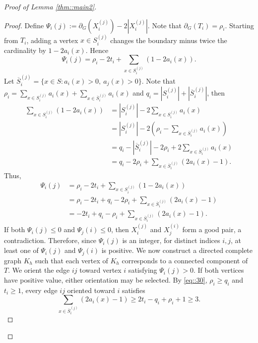 \documentclass[11pt]{article}
\theoremstyle{definition}
\begin{document}
\begin{proof}[Proof of Lemma \ref{thm::main2}]
\begin{proof}
    Define $\Psi_i(j) :=\partial_G(X_i^{(j)})-2|X_i^{(j)}|$.  Note that $\partial_G(T_i)=\rho_i$.  Starting from $T_i$, adding a vertex $x\in S_i^{(j)}$ changes the boundary minus twice the cardinality by $1-2a_i(x)$. Hence
    $$
      \Psi_i(j)=\rho_i-2t_i+\sum_{x\in S_i^{(j)}}(1-2a_i(x)).
    $$
    Let $\overline{S}_{i}^{(j)}=\{x\in S:a_i(x)>0,\ a_j(x)>0\}$. Note that $\rho_i=\sum_{x\in S_i^{(j)}}a_i(x)+\sum_{x\in \overline{S}_{i}^{(j)}}a_i(x)$ and $q_i=|S_i^{(j)}|+|\overline{S}_{i}^{(j)}|$, then
    \begin{equation*}
      \begin{aligned}
        \sum_{x\in S_i^{(j)}}(1-2a_i(x)) & = |S_i^{(j)}|-2\sum_{x\in S_i^{(j)}}a_i(x)                                      \\
                                         & =|S_i^{(j)}|-2(\rho_i-\sum_{x\in \overline{S}_{i}^{(j)}}a_i(x))                 \\
                                         & =q_i-|\overline{S}_{i}^{(j)}|-2\rho_i+2\sum_{x\in \overline{S}_{i}^{(j)}}a_i(x) \\
                                         & =q_i-2\rho_i+\sum_{x\in \overline{S}_{i}^{(j)}}(2a_i(x)-1).
      \end{aligned}
    \end{equation*}
    Thus,
    \begin{equation}\label{eq::30}
      \begin{aligned}
        \Psi_i(j) & =\rho_i-2t_i+\sum_{x\in S_i^{(j)}}(1-2a_i(x))                          \\
                  & =\rho_i-2t_i+q_i-2\rho_i+\sum_{x\in \overline{S}_{i}^{(j)}}(2a_i(x)-1) \\
                  & =-2t_i+q_i-\rho_i
        +\sum_{x\in \overline{S}_{i}^{(j)}}
        (2a_i(x)-1).
      \end{aligned}
    \end{equation}
    If both $\Psi_i(j)\le0$ and $\Psi_j(i)\le0$, then $X_i^{(j)}$ and $X_j^{(i)}$ form a good pair, a contradiction. Therefore, since $\Psi_i(j)$ is an integer, for distinct indices $i,j$, at least one of $\Psi_i(j)$ and $\Psi_j(i)$ is positive. We now construct a directed complete graph $K_h$ such that each vertex of $K_h$ corresponds to a connected component of $T$. We orient the edge $ij$ toward vertex $i$ satisfying $\Psi_i(j)>0$. If both vertices have positive value, either orientation may be selected. By \eqref{eq::30}, $\rho_i\geq q_i$ and $t_i\geq 1$,  every edge $ij$ oriented toward $i$ satisfies
    \begin{equation}\label{eq::31}
      \sum_{x\in \overline{S}_{i}^{(j)}}(2a_i(x)-1) \ge 2t_i-q_i+\rho_i+1 \ge 3.
    \end{equation}


\end{proof}
\end{proof}
\end{document}
